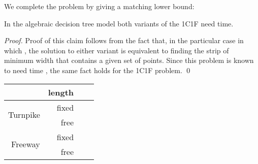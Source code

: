 \documentclass{llncs}
\begin{document}
We complete the problem by giving a matching lower bound:

\begin{theorem}\label{theo_lowerFL1C1F}
In the algebraic decision tree model both variants of the 1C1F need  time.
\end{theorem}
\begin{proof}
Proof of this claim follows from the fact that, in the particular case in which , the solution to either variant is equivalent to finding the strip of minimum width that contains a given set of points. Since this problem is known to need  time \cite{lw-gcslp-86}, the same fact holds for the 1C1F problem. \qed
\end{proof}

\iffalse
\subsubsection{Anchored Fixed Length FL-problem}


In this section we study the case in which the position of the facility is fixed (without loss of generality, we can assume that  is situated at the origin). That is, we are interested in finding the location of a freeway  of unit length that minimizes . This kind of problem has been given a special interest (see for example \cite{ahn09,kt-oishcm-08}). 

By Lemma \ref{lem:characfree}, we only have two degrees of freedom:  and  (the angle that  makes with the abscissa ordinate and the distance between the lower leftmost endpoint of the highway and . Given a pair , let  be the associated highway. As in the previous cases we assume that .

For any , we define  as . That is, the distance between a fixed point  and  after locating highway .

\begin{lemma}
For any , function  is quasiconvex.
\end{lemma}
\begin{proof}
\end{proof}


Combining this Lemma with the results of \cite{c-oramtd-04} we obtain the following result.
\begin{theorem}
The Anchored Fixed Length 1C1F can be solved in randomized expected  time.
\end{theorem}
\fi




\begin{center}
\begin{tabular}{|r|r|c|c|}
\hline
& length &  &  \\
\hline
\multirow{2}{24mm}{Turnpike} & fixed &  &  \\
\cline{2-4}
& free &  &  \\
\cline{1-4}
\multirow{2}{24mm}{Freeway}& fixed &  & \\
\cline{2-4}
& free & &  \\\hline
\end{tabular}
\end{center}
\end{document}
